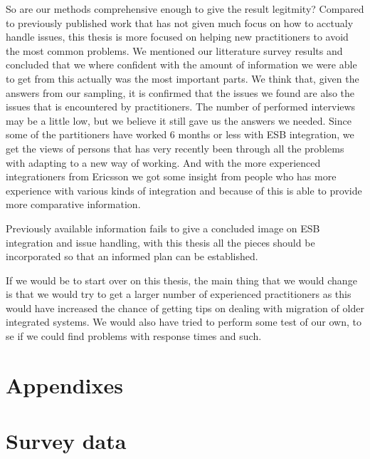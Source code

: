 \documentclass{llncs}
\begin{document}
So are our methods comprehensive enough to give the result legitmity? Compared to previously published work that has not given much focus on how to acctualy handle issues, this thesis is more focused on helping new practitioners to avoid the most common problems.
We mentioned our litterature survey results and concluded that we where confident with the amount of information we were able to get from this actually was the most important parts. We think that, given the answers from our sampling, it is confirmed that the issues we found are also the issues that is encountered by practitioners.
The number of performed interviews may be a little low, but we believe it still gave us the answers we needed. Since some of the partitioners have worked 6 months or less with ESB integration, we get the views of persons that has very recently been through all the problems with adapting to a new way of working. And with the more experienced integrationers from Ericsson we got some insight from people who has more experience with various kinds of integration and because of this is able to provide more comparative information.

Previously available information fails to give a concluded image on ESB integration and issue handling, with this thesis all the pieces should be incorporated so that an informed plan can be established.

If we would be to start over on this thesis, the main thing that we would change is that we would try to get a larger number of experienced practitioners as this would have increased the chance of getting tips on dealing with migration of older integrated systems. We would also have tried to perform some test of our own, to se if we could find problems with response times and such.

\newpage



\newpage
\section*{Appendixes}
\appendix
\section{Survey data}
\end{document}
